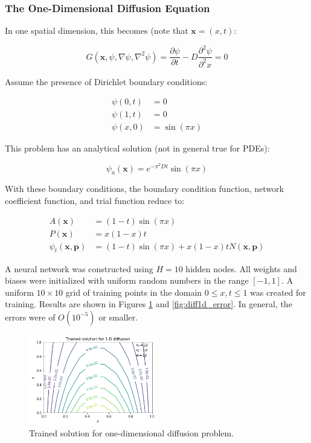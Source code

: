 \documentclass{article}
\begin{document}
\subsubsection{The One-Dimensional Diffusion Equation}

In one spatial dimension, this becomes (note that $\mathbf x = (x,t)$:

\begin{equation}
  G \left( \mathbf x, \psi, \nabla \psi, \nabla^2 \psi \right) = \frac {\partial \psi} {\partial t} - D \frac {\partial^2 \psi} {\partial^2 x} = 0
\end{equation}

Assume the presence of Dirichlet boundary conditions:

\begin{equation}
\begin{split}
  \psi(0,t) &= 0 \\
  \psi(1,t) &= 0 \\
  \psi(x,0) &= \sin(\pi x)
\end{split}
\end{equation}

This problem has an analytical solution (not in general true for PDEs):

\begin{equation}
  \psi_a(\mathbf x) = e^{-\pi^2 D t} \sin(\pi x)
\end{equation}

With these boundary conditions, the boundary condition function, network coefficient function, and trial function reduce to:

\begin{equation}
\begin{split}
  A(\mathbf x) &= (1 - t)\sin(\pi x) \\
  P(\mathbf x) &= x(1 - x)t \\
  \psi_t(\mathbf x,\mathbf p) &= (1 - t)\sin(\pi x) + x(1 - x)t N(\mathbf x,\mathbf p)
\end{split}
\end{equation}

A neural network was constructed using $H=10$ hidden nodes. All weights and biases were initialized with uniform random numbers in the range $[-1,1]$. A uniform $10\times10$ grid of training points in the domain $0 \leq x,t \leq 1$ was created for training. Results are shown in Figures \ref{fig:diff1d_trained} and \ref{fig:diff1d_error}. In general, the errors were of $O(10^{-5})$ or smaller.

\begin{figure}
    \centering
    \includegraphics[width=0.5\textwidth]{figures/diff1d_trained.png}
    \caption{Trained solution for one-dimensional diffusion problem.}
    \label{fig:diff1d_trained}
\end{figure}
\end{document}
